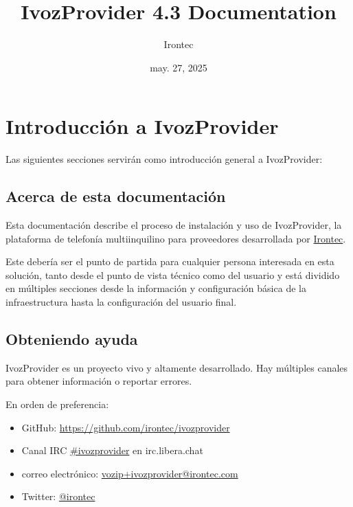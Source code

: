 \documentclass[letterpaper,10pt,spanish]{sphinxmanual}
\title{IvozProvider 4.3 Documentation}
\date{may. 27, 2025}
\author{Irontec}
\begin{document}
\maketitle
\tableofcontents
{}\label{index::doc}



\chapter{Introducción a IvozProvider}
\label{basic_concepts/intro/index::doc}\label{basic_concepts/intro/index:introduction-to-ivozprovider}\label{basic_concepts/intro/index:ivozprovider-official-documentation}
Las siguientes secciones servirán como introducción general a IvozProvider:


\section{Acerca de esta documentación}
\label{basic_concepts/intro/about::doc}\label{basic_concepts/intro/about:about-this-documentation}
Esta documentación describe el proceso de instalación y uso de IvozProvider, la plataforma de telefonía multiinquilino para proveedores desarrollada por \href{http://irontec.com}{Irontec}.

Este debería ser el punto de partida para cualquier persona interesada en esta solución, tanto desde el punto de vista técnico como del usuario y está dividido en múltiples secciones desde la información y configuración básica de la infraestructura hasta la configuración del usuario final.


\section{Obteniendo ayuda}
\label{basic_concepts/intro/getting_help:getting-help}\label{basic_concepts/intro/getting_help::doc}\label{basic_concepts/intro/getting_help:id1}
IvozProvider es un proyecto vivo y altamente desarrollado. Hay múltiples canales para obtener información o reportar errores.

En orden de preferencia:
\begin{itemize}
\item {} 
GitHub: \url{https://github.com/irontec/ivozprovider}

\item {} 
Canal IRC \href{https://kiwiirc.com/nextclient/irc.libera.chat/\#ivozprovider}{\#ivozprovider} en irc.libera.chat

\item {} 
correo electrónico: \href{mailto:vozip+ivozprovider@irontec.com}{vozip+ivozprovider@irontec.com}

\item {} 
Twitter: \href{https://twitter.com/irontec}{@irontec}

\end{itemize}
\end{document}
